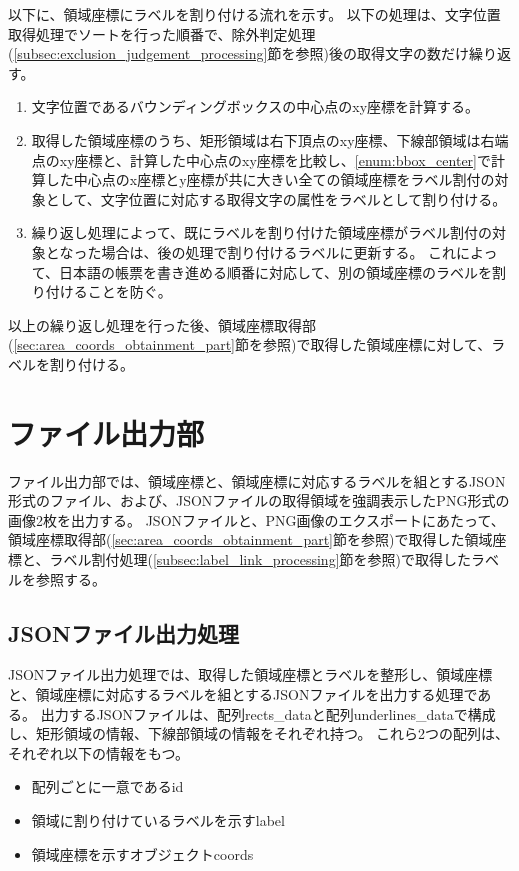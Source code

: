 以下に、領域座標にラベルを割り付ける流れを示す。
以下の処理は、文字位置取得処理でソートを行った順番で、除外判定処理(\ref{subsec:exclusion_judgement_processing}節を参照)後の取得文字の数だけ繰り返す。

\begin{enumerate}
    \item \label{enum:bbox_center} 文字位置であるバウンディングボックスの中心点のxy座標を計算する。
    \item 取得した領域座標のうち、矩形領域は右下頂点のxy座標、下線部領域は右端点のxy座標と、計算した中心点のxy座標を比較し、\ref{enum:bbox_center}で計算した中心点のx座標とy座標が共に大きい全ての領域座標をラベル割付の対象として、文字位置に対応する取得文字の属性をラベルとして割り付ける。
    \item 繰り返し処理によって、既にラベルを割り付けた領域座標がラベル割付の対象となった場合は、後の処理で割り付けるラベルに更新する。
          これによって、日本語の帳票を書き進める順番に対応して、別の領域座標のラベルを割り付けることを防ぐ。
\end{enumerate}

以上の繰り返し処理を行った後、領域座標取得部(\ref{sec:area_coords_obtainment_part}節を参照)で取得した領域座標に対して、ラベルを割り付ける。

\section{ファイル出力部}\label{subsec:file_output_part}
ファイル出力部では、領域座標と、領域座標に対応するラベルを組とするJSON形式のファイル、および、JSONファイルの取得領域を強調表示したPNG形式の画像2枚を出力する。
JSONファイルと、PNG画像のエクスポートにあたって、領域座標取得部(\ref{sec:area_coords_obtainment_part}節を参照)で取得した領域座標と、ラベル割付処理(\ref{subsec:label_link_processing}節を参照)で取得したラベルを参照する。

\subsection{JSONファイル出力処理}\label{subsec:json_file_output_processing}
JSONファイル出力処理では、取得した領域座標とラベルを整形し、領域座標と、領域座標に対応するラベルを組とするJSONファイルを出力する処理である。
出力するJSONファイルは、配列rects\_dataと配列underlines\_dataで構成し、矩形領域の情報、下線部領域の情報をそれぞれ持つ。
これら2つの配列は、それぞれ以下の情報をもつ。

\begin{itemize}
    \item 配列ごとに一意であるid
    \item 領域に割り付けているラベルを示すlabel
    \item 領域座標を示すオブジェクトcoords
\end{itemize}

